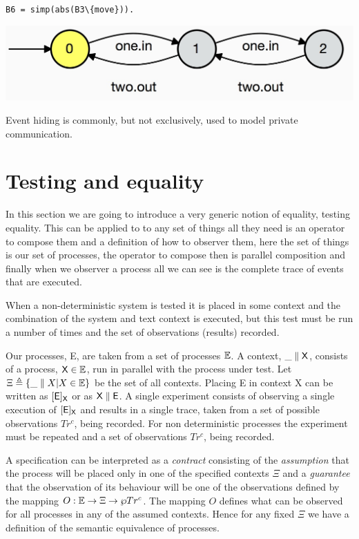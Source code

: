 \documentclass[]{article}
\begin{document}
\noindent\begin{center}\verb$B6 = simp(abs(B3\{move})).$

 \includegraphics[scale=0.15]{B6.jpg} \end{center} 
   

Event hiding is commonly, but not exclusively,   used to model private  communication.

\section{Testing and equality}
In this section we are going to introduce  a very generic notion of equality, testing equality. This can be applied to to any set of things all they need is an operator to compose them and a definition of how to observer them, here the set of things is our set of processes, the operator to compose then is parallel composition and finally when we observer a process all we can see is the complete trace of events that are executed.

When a non-deterministic system is tested it is placed in some context and the combination of the system and text context is executed, but this test must be run a number of times and the set of observations (results) recorded.  


Our processes, {\sf E},  are taken from a set of processes $\mathbb E$. A context, ${\sf \_\parallel X}$, consists of a process, ${\sf X}\in \mathbb E$,  run in parallel with the process under test. Let  $\Xi\triangleq \{\_\parallel X | X\in \Emath\}$ be  the set of all contexts. 
Placing  {\sf E} in context {\sf X} can be   written as  $[{\sf E}]_{\sf X}$ or as ${\sf X\parallel E}$.   A single experiment consists of observing a single execution of $[{\sf E}]_{\sf X}$ and  results in a single trace, taken from a set of possible observations $Tr^c$, being recorded.
For non deterministic processes the experiment must be repeated and a set of observations $Tr^c$, being recorded.

A specification can be  interpreted as a \emph{contract} consisting of the \emph{assumption} that the process will be placed only in one of the specified contexts $\Xi$ and a \emph{guarantee} that the observation of its behaviour will be one of the observations defined by the mapping $O: \mathbb E \rightarrow\Xi\rightarrow \wp Tr^c$.  The mapping $O$ defines what can be observed  for all processes in any of the assumed contexts. Hence for any fixed $\Xi$  we have a definition of the semantic equivalence of processes.
\end{document}
